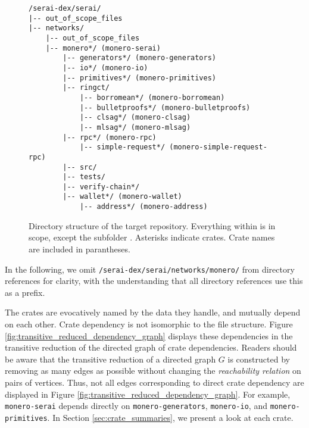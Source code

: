 \documentclass[12pt,a4paper]{article}
\begin{document}
\begin{figure}[h]
\centering
\begin{minipage}{0.9\linewidth}
\begin{mdframed}
\begin{verbatim}
/serai-dex/serai/
|-- out_of_scope_files
|-- networks/
    |-- out_of_scope_files
    |-- monero*/ (monero-serai)
        |-- generators*/ (monero-generators)
        |-- io*/ (monero-io)
        |-- primitives*/ (monero-primitives)
        |-- ringct/
            |-- borromean*/ (monero-borromean)
            |-- bulletproofs*/ (monero-bulletproofs)
            |-- clsag*/ (monero-clsag)
            |-- mlsag*/ (monero-mlsag)
        |-- rpc*/ (monero-rpc)
            |-- simple-request*/ (monero-simple-request-rpc)
        |-- src/
        |-- tests/
        |-- verify-chain*/
        |-- wallet*/ (monero-wallet)
            |-- address*/ (monero-address)
\end{verbatim}
\end{mdframed}
\end{minipage}
\caption{Directory structure of the target repository. Everything within \protect{} is in scope, except the subfolder \protect{}. Asterisks indicate crates. Crate names are included in parantheses.}
\label{fig:directory_structure}
\end{figure}





In the following, we omit \texttt{/serai-dex/serai/networks/monero/} from directory references for clarity, with the understanding that all directory references use this as a prefix.

The crates are evocatively named by the data they handle, and mutually depend on each other. Crate dependency is not isomorphic to the file structure. 
Figure \ref{fig:transitive_reduced_dependency_graph} displays these dependencies in the transitive reduction of the directed graph of crate dependencies. Readers should be aware that the transitive reduction of a directed graph $G$ is constructed by removing as many edges as possible without changing the \textit{reachability relation} on pairs of vertices. Thus, not all edges corresponding to direct crate dependency are displayed in Figure \ref{fig:transitive_reduced_dependency_graph}. For example, \texttt{monero-serai} depends directly on \texttt{monero-generators}, \texttt{monero-io}, and \texttt{monero-primitives}.
In Section \ref{sec:crate_summaries}, we present a look at each crate. 
\end{document}
